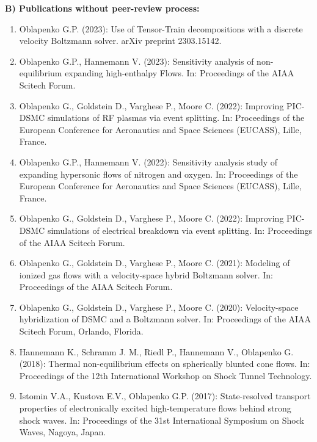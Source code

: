 \documentclass{resume} %
\begin{document}
{\bf B) Publications without peer-review process:}
\begin{enumerate}
    
    \item {Oblapenko G.P.} (2023): Use of Tensor-Train decompositions with a discrete velocity Boltzmann solver. arXiv preprint 2303.15142.
    
    \item {Oblapenko G.P., Hannemann V.} (2023): Sensitivity analysis of non-equilibrium expanding high-enthalpy Flows. In: Proceedings of the AIAA Scitech Forum.

    \item {Oblapenko G., Goldstein D., Varghese P., Moore C.} (2022): Improving PIC-DSMC simulations of RF plasmas via event splitting. In: Proceedings of the European Conference for Aeronautics and Space Sciences (EUCASS), Lille, France.

    \item {Oblapenko G.P., Hannemann V.} (2022): Sensitivity analysis study of expanding hypersonic flows of nitrogen and oxygen. In: Proceedings of the European Conference for Aeronautics and Space Sciences (EUCASS), Lille, France.

    \item {Oblapenko G., Goldstein D., Varghese P., Moore C.} (2022): Improving PIC-DSMC simulations of electrical breakdown via event splitting. In: Proceedings of the AIAA Scitech Forum.
    
    \item {Oblapenko G., Goldstein D., Varghese P., Moore C.} (2021): Modeling of ionized gas flows with a velocity-space hybrid Boltzmann solver. In: Proceedings of the AIAA Scitech Forum.
    
    \item {Oblapenko G., Goldstein D., Varghese P., Moore C.} (2020): Velocity-space hybridization of DSMC and a Boltzmann solver. In: Proceedings of the AIAA Scitech Forum, Orlando, Florida.

    \item {Hannemann K., Schramm J. M., Riedl P., Hannemann V., { Oblapenko G.}} (2018): Thermal non-equilibrium effects on spherically blunted cone flows. In: Proceedings of the 12th International Workshop on Shock Tunnel Technology.
    
    \item Istomin V.A., Kustova E.V., {Oblapenko G.P.} (2017): State-resolved transport properties of electronically excited high-temperature flows behind strong shock waves. In: Proceedings of the 31st International Symposium on Shock Waves, Nagoya, Japan.
    

\end{enumerate}
\end{document}
